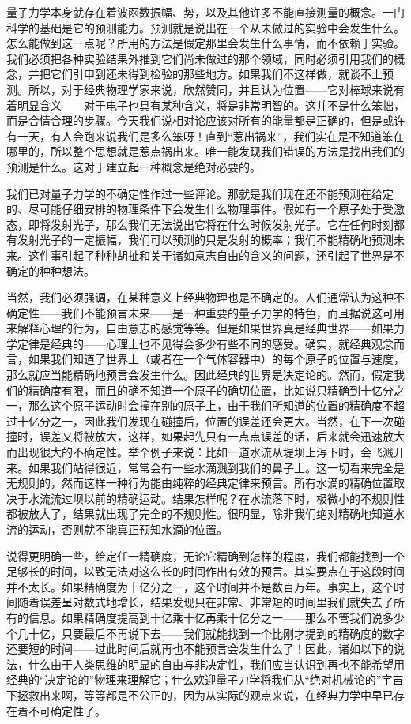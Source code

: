 量子力学本身就存在着波函数振幅、势，以及其他许多不能直接测量的概念。一门科学的基础是它的预测能力。预测就是说出在一个从未做过的实验中会发生什么。怎么能做到这一点呢？所用的方法是假定那里会发生什么事情，而不依赖于实验。我们必须把各种实验结果外推到它们尚未做过的那个领域，同时必须引用我们的概念，并把它们引申到还未得到检验的那些地方。如果我们不这样做，就谈不上预测。所以，对于经典物理学家来说，欣然赞同，并且认为位置——它对棒球来说有着明显含义——对于电子也具有某种含义，将是非常明智的。这并不是什么笨拙，而是合情合理的步骤。今天我们说相对论应该对所有的能量都是正确的，但是或许有一天，有人会跑来说我们是多么笨呀！直到“惹出祸来”，我们实在是不知道笨在哪里的，所以整个思想就是惹点祸出来。唯一能发现我们错误的方法是找出我们的预测是什么。这对于建立起一种概念是绝对必要的。

我们已对量子力学的不确定性作过一些评论。那就是我们现在还不能预测在给定的、尽可能仔细安排的物理条件下会发生什么物理事件。假如有一个原子处于受激态，即将发射光子，那么我们无法说出它将在什么时候发射光子。它在任何时刻都有发射光子的一定振幅，我们可以预测的只是发射的概率；我们不能精确地预测未来。这件事引起了种种胡扯和关于诸如意志自由的含义的问题，还引起了世界是不确定的种种想法。

当然，我们必须强调，在某种意义上经典物理也是不确定的。人们通常认为这种不确定性——我们不能预言未来——是一种重要的量子力学的特色，而且据说这可用来解释心理的行为，自由意志的感觉等等。但是如果世界真是经典世界——如果力学定律是经典的——心理上也不见得会多少有些不同的感受。确实，就经典观念而言，如果我们知道了世界上（或者在一个气体容器中）的每个原子的位置与速度，那么就应当能精确地预言会发生什么。因此经典的世界是决定论的。然而，假定我们的精确度有限，而且的确不知道一个原子的确切位置，比如说只精确到十亿分之一，那么这个原子运动时会撞在别的原子上，由于我们所知道的位置的精确度不超过十亿分之一，因此我们发现在碰撞后，位置的误差还会更大。当然，在下一次碰撞时，误差又将被放大，这样，如果起先只有一点点误差的话，后来就会迅速放大而出现很大的不确定性。举个例子来说：比如一道水流从堤坝上泻下时，会飞溅开来。如果我们站得很近，常常会有一些水滴溅到我们的鼻子上。这一切看来完全是无规则的，然而这样一种行为能由纯粹的经典定律来预言。所有水滴的精确位置取决于水流流过坝以前的精确运动。结果怎样呢？在水流落下时，极微小的不规则性都被放大了，结果就出现了完全的不规则性。很明显，除非我们绝对精确地知道水流的运动，否则就不能真正预知水滴的位置。

说得更明确一些，给定任一精确度，无论它精确到怎样的程度，我们都能找到一个足够长的时间，以致无法对这么长的时间作出有效的预言。其实要点在于这段时间并不太长。如果精确度为十亿分之一，这个时间并不是数百万年。事实上，这个时间随着误差呈对数式地增长，结果发现只在非常、非常短的时间里我们就失去了所有的信息。如果精确度提高到十亿乘十亿再乘十亿分之一——那么不管我们说多少个几十亿，只要最后不再说下去——我们就能找到一个比刚才提到的精确度的数字还要短的时间——过此时间后就再也不能预言会发生什么了！因此，诸如以下的说法，什么由于人类思维的明显的自由与非决定性，我们应当认识到再也不能希望用经典的“决定论的”物理来理解它；什么欢迎量子力学将我们从“绝对机械论的”宇宙下拯救出来啊，等等都是不公正的，因为从实际的观点来说，在经典力学中早已存在着不可确定性了。